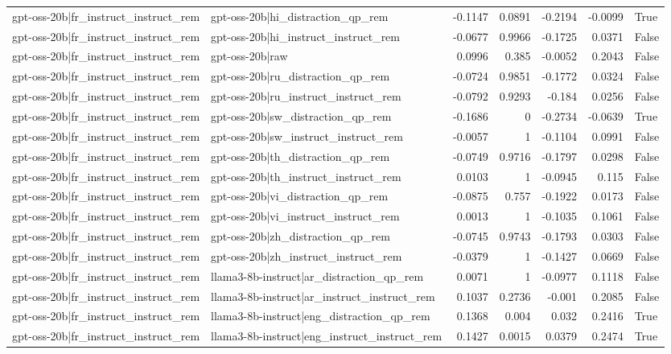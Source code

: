 \begin{table}
\begin{tabular}{l l r r r r l}
gpt-oss-20b|fr_instruct_instruct_rem & gpt-oss-20b|hi_distraction_qp_rem & -0.1147 & 0.0891 & -0.2194 & -0.0099 & True \\
gpt-oss-20b|fr_instruct_instruct_rem & gpt-oss-20b|hi_instruct_instruct_rem & -0.0677 & 0.9966 & -0.1725 & 0.0371 & False \\
gpt-oss-20b|fr_instruct_instruct_rem & gpt-oss-20b|raw & 0.0996 & 0.385 & -0.0052 & 0.2043 & False \\
gpt-oss-20b|fr_instruct_instruct_rem & gpt-oss-20b|ru_distraction_qp_rem & -0.0724 & 0.9851 & -0.1772 & 0.0324 & False \\
gpt-oss-20b|fr_instruct_instruct_rem & gpt-oss-20b|ru_instruct_instruct_rem & -0.0792 & 0.9293 & -0.184 & 0.0256 & False \\
gpt-oss-20b|fr_instruct_instruct_rem & gpt-oss-20b|sw_distraction_qp_rem & -0.1686 & 0 & -0.2734 & -0.0639 & True \\
gpt-oss-20b|fr_instruct_instruct_rem & gpt-oss-20b|sw_instruct_instruct_rem & -0.0057 & 1 & -0.1104 & 0.0991 & False \\
gpt-oss-20b|fr_instruct_instruct_rem & gpt-oss-20b|th_distraction_qp_rem & -0.0749 & 0.9716 & -0.1797 & 0.0298 & False \\
gpt-oss-20b|fr_instruct_instruct_rem & gpt-oss-20b|th_instruct_instruct_rem & 0.0103 & 1 & -0.0945 & 0.115 & False \\
gpt-oss-20b|fr_instruct_instruct_rem & gpt-oss-20b|vi_distraction_qp_rem & -0.0875 & 0.757 & -0.1922 & 0.0173 & False \\
gpt-oss-20b|fr_instruct_instruct_rem & gpt-oss-20b|vi_instruct_instruct_rem & 0.0013 & 1 & -0.1035 & 0.1061 & False \\
gpt-oss-20b|fr_instruct_instruct_rem & gpt-oss-20b|zh_distraction_qp_rem & -0.0745 & 0.9743 & -0.1793 & 0.0303 & False \\
gpt-oss-20b|fr_instruct_instruct_rem & gpt-oss-20b|zh_instruct_instruct_rem & -0.0379 & 1 & -0.1427 & 0.0669 & False \\
gpt-oss-20b|fr_instruct_instruct_rem & llama3-8b-instruct|ar_distraction_qp_rem & 0.0071 & 1 & -0.0977 & 0.1118 & False \\
gpt-oss-20b|fr_instruct_instruct_rem & llama3-8b-instruct|ar_instruct_instruct_rem & 0.1037 & 0.2736 & -0.001 & 0.2085 & False \\
gpt-oss-20b|fr_instruct_instruct_rem & llama3-8b-instruct|eng_distraction_qp_rem & 0.1368 & 0.004 & 0.032 & 0.2416 & True \\
gpt-oss-20b|fr_instruct_instruct_rem & llama3-8b-instruct|eng_instruct_instruct_rem & 0.1427 & 0.0015 & 0.0379 & 0.2474 & True \\

\end{tabular}
\end{table}
